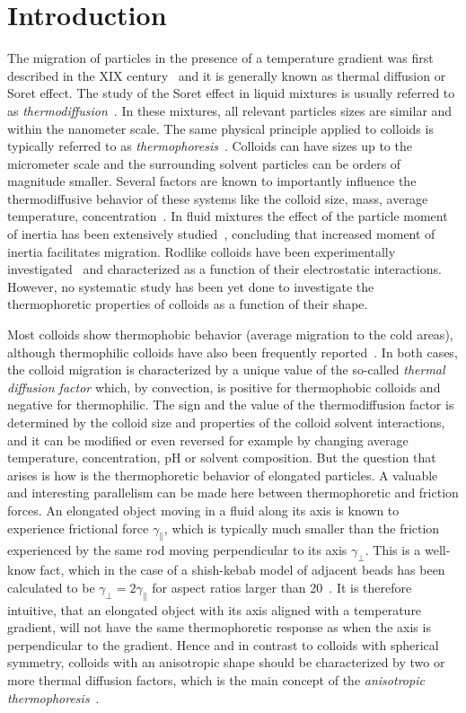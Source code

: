 \documentclass[aps,pre,twocolumn,showpacs,superscriptaddress]{revtex4-1}
\begin{document}
\section{Introduction}
The migration of particles in the presence of a temperature gradient
was first described in the XIX century~\cite{ludwig56,soret79} and it
is generally known as thermal diffusion or Soret effect.  The study of
the Soret effect in liquid mixtures is usually referred to as {\em
  thermodiffusion}~\cite{wieg04}. In these mixtures, all
relevant particles sizes are similar and within the nanometer scale.
The same physical principle applied to colloids is typically referred
to as {\em thermophoresis}~\cite{piazza08r,wuerger10r}. Colloids can
have sizes up to the micrometer scale and the surrounding solvent
particles can be orders of magnitude smaller.  Several factors are
known to importantly influence the thermodiffusive behavior of these
systems like the colloid size, mass, average temperature,
concentration~\cite{wieg04,piazza08r}.  In fluid mixtures the effect
of the particle moment of inertia has been extensively
studied~\cite{plathe00,koeh01,gal03}, concluding that increased moment
of inertia facilitates migration. Rodlike colloids have been
experimentally investigated~\cite{blanco11,wang13} and characterized
as a function of their electrostatic interactions.  However, no
systematic study has been yet done to investigate the thermophoretic
properties of colloids as a function of their shape.

Most colloids show thermophobic behavior (average migration to the
cold areas), although thermophilic colloids have also been frequently
reported~\cite{braun06,piazza06}. In both cases, the colloid migration
is characterized by a unique value of the so-called {\em thermal
  diffusion factor} which, by convection, is positive for thermophobic
colloids and negative for thermophilic. The sign and the value of the
thermodiffusion factor is determined by the colloid size and
properties of the colloid solvent interactions, and it can be modified
or even reversed for example by changing average temperature,
concentration, pH or solvent composition.  %
But the question that arises is how is the thermophoretic behavior of
elongated particles. %
A valuable and interesting parallelism can be made here between
thermophoretic and friction forces.  An elongated object moving in a
fluid along its axis is known to experience frictional force
$\gamma_\|$, which is typically much smaller than the friction
experienced by the same rod moving perpendicular to its axis
$\gamma_\perp$. This is a well-know fact, which in the case of a
shish-kebab model of adjacent beads has been calculated to be
$\gamma_\perp = 2 \gamma_\|$ for aspect ratios larger than
20~\cite{doi}.  %
It is therefore intuitive, that an elongated object with its axis
aligned with a temperature gradient, will not have the same
thermophoretic response as when the axis is perpendicular to the
gradient. %
Hence and in contrast to colloids with spherical symmetry, colloids
with an anisotropic shape should be characterized by two or more
thermal diffusion factors, which is the main concept of the {\em
  anisotropic thermophoresis}~\cite{yang14turb}.
\end{document}
